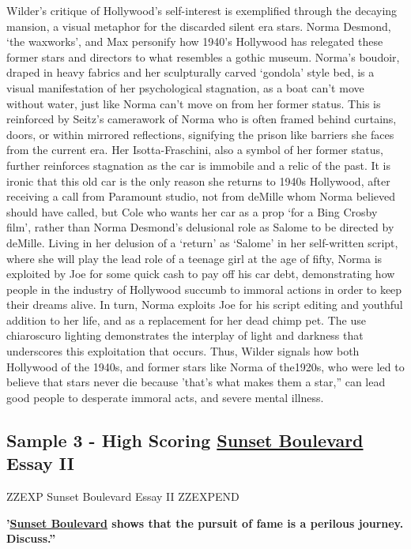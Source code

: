 \documentclass[a4paper]{article}
\begin{document}
Wilder’s critique of Hollywood’s self-interest is exemplified through the decaying mansion, a visual metaphor for the discarded silent era stars. Norma Desmond, ‘the waxworks’, and Max personify how 1940’s Hollywood has relegated these former stars and directors to what resembles a gothic museum. Norma’s boudoir, draped in heavy fabrics and her sculpturally carved ‘gondola’ style bed, is a visual manifestation of her psychological stagnation, as a boat can’t move without water, just like Norma can’t move on from her former status. This is reinforced by Seitz’s camerawork of Norma who is often framed behind curtains, doors, or within mirrored reflections, signifying the prison like barriers she faces from the current era. Her Isotta-Fraschini, also a symbol of her former status, further reinforces stagnation as the car is immobile and a relic of the past. It is ironic that this old car is the only reason she returns to 1940s Hollywood, after receiving a call from Paramount studio, not from deMille whom Norma believed should have called, but Cole who wants her car as a prop ‘for a Bing Crosby film’, rather than Norma Desmond’s delusional role as Salome to be directed by deMille. Living in her delusion of a ‘return’ as ‘Salome’ in her self-written script, where she will play the lead role of a teenage girl at the age of fifty, Norma is exploited by Joe for some quick cash to pay off his car debt, demonstrating how people in the industry of Hollywood succumb to immoral actions in order to keep their dreams alive. In turn, Norma exploits Joe for his script editing and youthful addition to her life, and as a replacement for her dead chimp pet. The use chiaroscuro lighting demonstrates the interplay of light and darkness that underscores this exploitation that occurs. Thus, Wilder signals how both Hollywood of the 1940s, and former stars like Norma of the1920s, who were led to believe that stars never die because 'that’s what makes them a star,” can lead good people to desperate immoral acts, and severe mental illness.\\

\newpage

\subsection{Sample 3 - High Scoring \underline{Sunset Boulevard} Essay II}


ZZEXP Sunset Boulevard Essay II ZZEXPEND



\textbf{'\underline{Sunset Boulevard} shows that the pursuit of fame is a perilous journey. Discuss.”}\\
\end{document}
